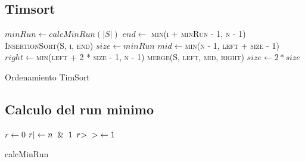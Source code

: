 \documentclass{article}
\begin{document}
\subsection{Timsort}

\begin{algorithm}[H]
\begin{algorithmic}[1]
  \State$minRun\leftarrow calcMinRun(|S|)$
    \State$end\leftarrow$ \textsc{min(i + minRun - 1, n - 1)}
    \State\textsc{InsertionSort(S, i, end)}
  \EndFor
  \State$size\leftarrow minRun$ 
        \State$mid\leftarrow$\textsc{min(n - 1, left + size - 1)}
        \State$right\leftarrow$\textsc{min(left + 2 * size - 1, n - 1)}
        \State\textsc{merge(S, left, mid, right)}
        \EndIf
    \EndFor
    \State$size\leftarrow2 * size$ 
    \EndWhile
\EndProcedure
\end{algorithmic}


\caption{Ordenamiento TimSort}
\end{algorithm}


\subsection{Calculo del run minimo}

\begin{algorithm}[H]
\begin{algorithmic}[1]
  \State$r\leftarrow 0$
    \State$r  \textbf{$ |{}$} \leftarrow n \And1$
    \State$r  \textbf{$ >{}>$} \leftarrow1$
    \EndWhile
    \State{}
\EndProcedure
\end{algorithmic}
\caption{calcMinRun}
\end{algorithm}
\end{document}
